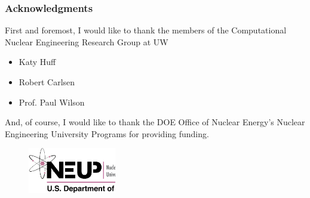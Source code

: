 \begin{frame}[ctb!]
  \frametitle{Acknowledgments}
  First and foremost, I would like to thank the members of the
  Computational Nuclear Engineering Research Group at UW 
  \begin{itemize}
    \item Katy Huff
    \item Robert Carlsen
    \item Prof. Paul Wilson
  \end{itemize}

  \vspace{0.2cm}

  And, of course, I would like to thank the DOE Office of Nuclear Energy's 
  Nuclear Engineering University Programs for providing funding. 
  \begin{figure}[htbp!]
    \begin{center}
      \includegraphics[height=2cm]{neup.ps}
    \end{center}
    \label{fig:neup}
  \end{figure}
\end{frame}
